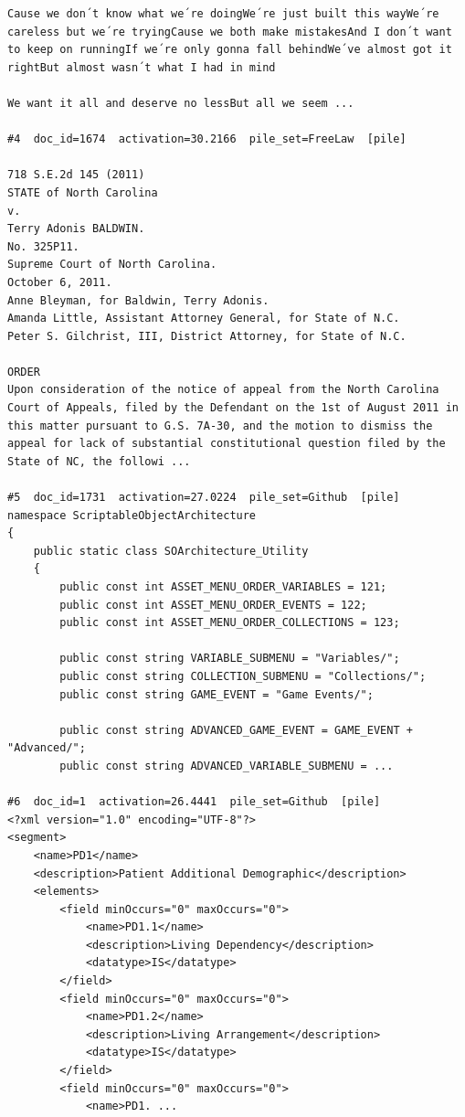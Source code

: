\begin{verbatim}
Cause we don´t know what we´re doingWe´re just built this wayWe´re careless but we´re tryingCause we both make mistakesAnd I don´t want to keep on runningIf we´re only gonna fall behindWe´ve almost got it rightBut almost wasn´t what I had in mind

We want it all and deserve no lessBut all we seem ...

#4  doc_id=1674  activation=30.2166  pile_set=FreeLaw  [pile]

718 S.E.2d 145 (2011)
STATE of North Carolina
v.
Terry Adonis BALDWIN.
No. 325P11.
Supreme Court of North Carolina.
October 6, 2011.
Anne Bleyman, for Baldwin, Terry Adonis.
Amanda Little, Assistant Attorney General, for State of N.C.
Peter S. Gilchrist, III, District Attorney, for State of N.C.

ORDER
Upon consideration of the notice of appeal from the North Carolina Court of Appeals, filed by the Defendant on the 1st of August 2011 in this matter pursuant to G.S. 7A-30, and the motion to dismiss the appeal for lack of substantial constitutional question filed by the State of NC, the followi ...

#5  doc_id=1731  activation=27.0224  pile_set=Github  [pile]
﻿namespace ScriptableObjectArchitecture
{
    public static class SOArchitecture_Utility
    {
        public const int ASSET_MENU_ORDER_VARIABLES = 121;
        public const int ASSET_MENU_ORDER_EVENTS = 122;
        public const int ASSET_MENU_ORDER_COLLECTIONS = 123;

        public const string VARIABLE_SUBMENU = "Variables/";
        public const string COLLECTION_SUBMENU = "Collections/";
        public const string GAME_EVENT = "Game Events/";

        public const string ADVANCED_GAME_EVENT = GAME_EVENT + "Advanced/";
        public const string ADVANCED_VARIABLE_SUBMENU = ...

#6  doc_id=1  activation=26.4441  pile_set=Github  [pile]
<?xml version="1.0" encoding="UTF-8"?>
<segment>
    <name>PD1</name>
    <description>Patient Additional Demographic</description>
    <elements>
        <field minOccurs="0" maxOccurs="0">
            <name>PD1.1</name>
            <description>Living Dependency</description>
            <datatype>IS</datatype>
        </field>
        <field minOccurs="0" maxOccurs="0">
            <name>PD1.2</name>
            <description>Living Arrangement</description>
            <datatype>IS</datatype>
        </field>
        <field minOccurs="0" maxOccurs="0">
            <name>PD1. ...


\end{verbatim}

